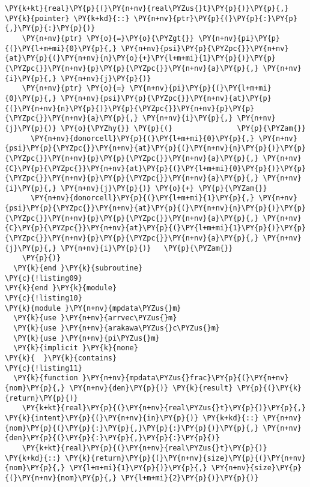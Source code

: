\begin{Verbatim}[commandchars=\\\{\}]
    \PY{k+kt}{real}\PY{p}{(}\PY{n+nv}{real\PYZus{}t}\PY{p}{)}\PY{p}{,} \PY{k}{pointer} \PY{k+kd}{::} \PY{n+nv}{ptr}\PY{p}{(}\PY{p}{:}\PY{p}{,}\PY{p}{:}\PY{p}{)}
    \PY{n+nv}{ptr} \PY{o}{=}\PY{o}{\PYZgt{}} \PY{n+nv}{pi}\PY{p}{(}\PY{l+m+mi}{0}\PY{p}{,} \PY{n+nv}{psi}\PY{p}{\PYZpc{}}\PY{n+nv}{at}\PY{p}{(}\PY{n+nv}{n}\PY{o}{+}\PY{l+m+mi}{1}\PY{p}{)}\PY{p}{\PYZpc{}}\PY{n+nv}{p}\PY{p}{\PYZpc{}}\PY{n+nv}{a}\PY{p}{,} \PY{n+nv}{i}\PY{p}{,} \PY{n+nv}{j}\PY{p}{)}
    \PY{n+nv}{ptr} \PY{o}{=} \PY{n+nv}{pi}\PY{p}{(}\PY{l+m+mi}{0}\PY{p}{,} \PY{n+nv}{psi}\PY{p}{\PYZpc{}}\PY{n+nv}{at}\PY{p}{(}\PY{n+nv}{n}\PY{p}{)}\PY{p}{\PYZpc{}}\PY{n+nv}{p}\PY{p}{\PYZpc{}}\PY{n+nv}{a}\PY{p}{,} \PY{n+nv}{i}\PY{p}{,} \PY{n+nv}{j}\PY{p}{)} \PY{o}{\PYZhy{}} \PY{p}{(}               \PY{p}{\PYZam{}}
      \PY{n+nv}{donorcell}\PY{p}{(}\PY{l+m+mi}{0}\PY{p}{,} \PY{n+nv}{psi}\PY{p}{\PYZpc{}}\PY{n+nv}{at}\PY{p}{(}\PY{n+nv}{n}\PY{p}{)}\PY{p}{\PYZpc{}}\PY{n+nv}{p}\PY{p}{\PYZpc{}}\PY{n+nv}{a}\PY{p}{,} \PY{n+nv}{C}\PY{p}{\PYZpc{}}\PY{n+nv}{at}\PY{p}{(}\PY{l+m+mi}{0}\PY{p}{)}\PY{p}{\PYZpc{}}\PY{n+nv}{p}\PY{p}{\PYZpc{}}\PY{n+nv}{a}\PY{p}{,} \PY{n+nv}{i}\PY{p}{,} \PY{n+nv}{j}\PY{p}{)} \PY{o}{+} \PY{p}{\PYZam{}}
      \PY{n+nv}{donorcell}\PY{p}{(}\PY{l+m+mi}{1}\PY{p}{,} \PY{n+nv}{psi}\PY{p}{\PYZpc{}}\PY{n+nv}{at}\PY{p}{(}\PY{n+nv}{n}\PY{p}{)}\PY{p}{\PYZpc{}}\PY{n+nv}{p}\PY{p}{\PYZpc{}}\PY{n+nv}{a}\PY{p}{,} \PY{n+nv}{C}\PY{p}{\PYZpc{}}\PY{n+nv}{at}\PY{p}{(}\PY{l+m+mi}{1}\PY{p}{)}\PY{p}{\PYZpc{}}\PY{n+nv}{p}\PY{p}{\PYZpc{}}\PY{n+nv}{a}\PY{p}{,} \PY{n+nv}{j}\PY{p}{,} \PY{n+nv}{i}\PY{p}{)}   \PY{p}{\PYZam{}}
    \PY{p}{)}
  \PY{k}{end }\PY{k}{subroutine}
\PY{c}{!listing09}
\PY{k}{end }\PY{k}{module}
\PY{c}{!listing10}
\PY{k}{module }\PY{n+nv}{mpdata\PYZus{}m}
  \PY{k}{use }\PY{n+nv}{arrvec\PYZus{}m}
  \PY{k}{use }\PY{n+nv}{arakawa\PYZus{}c\PYZus{}m}
  \PY{k}{use }\PY{n+nv}{pi\PYZus{}m}
  \PY{k}{implicit }\PY{k}{none}
\PY{k}{  }\PY{k}{contains} 
\PY{c}{!listing11}
  \PY{k}{function }\PY{n+nv}{mpdata\PYZus{}frac}\PY{p}{(}\PY{n+nv}{nom}\PY{p}{,} \PY{n+nv}{den}\PY{p}{)} \PY{k}{result} \PY{p}{(}\PY{k}{return}\PY{p}{)}
    \PY{k+kt}{real}\PY{p}{(}\PY{n+nv}{real\PYZus{}t}\PY{p}{)}\PY{p}{,} \PY{k}{intent}\PY{p}{(}\PY{n+nv}{in}\PY{p}{)} \PY{k+kd}{::} \PY{n+nv}{nom}\PY{p}{(}\PY{p}{:}\PY{p}{,}\PY{p}{:}\PY{p}{)}\PY{p}{,} \PY{n+nv}{den}\PY{p}{(}\PY{p}{:}\PY{p}{,}\PY{p}{:}\PY{p}{)}
    \PY{k+kt}{real}\PY{p}{(}\PY{n+nv}{real\PYZus{}t}\PY{p}{)} \PY{k+kd}{::} \PY{k}{return}\PY{p}{(}\PY{n+nv}{size}\PY{p}{(}\PY{n+nv}{nom}\PY{p}{,} \PY{l+m+mi}{1}\PY{p}{)}\PY{p}{,} \PY{n+nv}{size}\PY{p}{(}\PY{n+nv}{nom}\PY{p}{,} \PY{l+m+mi}{2}\PY{p}{)}\PY{p}{)}

\end{Verbatim}
